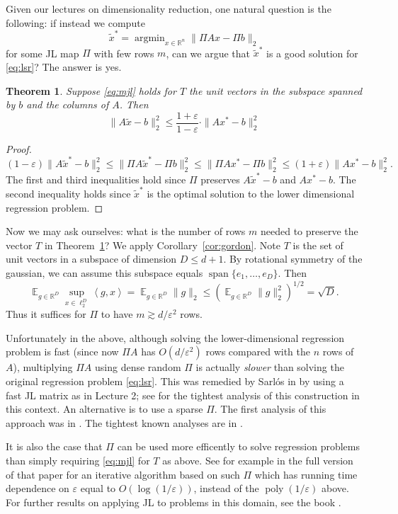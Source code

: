 \documentclass[12pt]{article}
\DeclareMathOperator*{\E}{\mathbb{E}}
\newcommand{\eps}{\varepsilon}
\newcommand{\inprod}[1]{\left\langle #1 \right\rangle}
\newcommand{\R}{\mathbb{R}}
\newtheorem{theorem}{Theorem}
\newcommand{\TheoremName}[1]{\label{thm:#1}}
\newcommand{\Corollary}[1]{Corollary~\ref{cor:#1}}
\newcommand{\Theorem}[1]{Theorem~\ref{thm:#1}}
\newcommand{\Eqsub}[1]{\eqref{eq:#1}}
\begin{document}
Given our lectures on dimensionality reduction, one natural question is the following: if instead we compute
$$
\tilde{x}^* = \mathop{argmin}_{x\in\R^n} \|\Pi Ax - \Pi b\|_2
$$
for some JL map $\Pi$ with few rows $m$, can we argue that $\tilde{x}^*$ is a good solution for \Eqsub{lsr}? The answer is yes.

\begin{theorem}\TheoremName{sarlos}
Suppose \Eqsub{mjl} holds for $T$ the unit vectors in the subspace spanned by $b$ and the columns of $A$. Then
$$
\|A\tilde{x} - b\|_2^2 \le \frac{1+\eps}{1-\eps}\cdot \|Ax^* - b\|_2^2
$$
\end{theorem}
\begin{proof}
$$
(1-\eps)\|A\tilde{x}^* - b\|_2^2 \le \|\Pi A\tilde{x}^* - \Pi b\|_2^2 \le \|\Pi Ax^* - \Pi b\|_2^2 \le (1+\eps)\|Ax^* - b\|_2^2 .
$$
The first and third inequalities hold since $\Pi$ preserves $A\tilde{x}^*-b$ and $Ax^*-b$. The second inequality holds since $\tilde{x}^*$ is the optimal solution to the lower dimensional regression problem.
\end{proof}

Now we may ask ourselves: what is the number of rows $m$ needed to preserve the vector $T$ in \Theorem{sarlos}? We apply \Corollary{gordon}. Note $T$ is the set of unit vectors in a subspace of dimension $D\le d+1$. By rotational symmetry of the gaussian, we can assume this subspace equals $\mathop{span}\{e_1,\ldots,e_D\}$. Then
$$
\E_{g\in\R^D} \sup_{x\in\ell_2^D}\inprod{g,x} = \E_{g\in\R^D} \|g\|_2 \le (\E_{g\in\R^D} \|g\|_2^2)^{1/2} = \sqrt{D} . 
$$
Thus it suffices for $\Pi$ to have $m\gtrsim d/\eps^2$ rows.

Unfortunately in the above, although solving the lower-dimensional regression problem is fast (since now $\Pi A$ has $O(d/\eps^2)$ rows compared with the $n$ rows of $A$), multiplying $\Pi A$ using dense random $\Pi$ is actually {\em slower} than solving the original regression problem \Eqsub{lsr}. This was remedied by Sarl\'{o}s in \cite{Sarlos06} by using a fast JL matrix as in Lecture 2; see \cite[Theorem 9]{CohenNW15} for the tightest analysis of this construction in this context. An alternative is to use a sparse $\Pi$. The first analysis of this approach was in \cite{ClarksonW13}. The tightest known analyses are in \cite{MengM13,NelsonN13,BourgainDN15}.

It is also the case that $\Pi$ can be used more efficently to solve regression problems than simply requiring \Eqsub{mjl} for $T$ as above. See for example \cite[Theorem 7.7]{ClarksonW13} in the full version of that paper for an iterative algorithm based on such $\Pi$ which has running time dependence on $\eps$ equal to $O(\log(1/\eps))$, instead of the $\mathop{poly}(1/\eps)$ above. For further results on applying JL to problems in this domain, see the book \cite{Woodruff14}.
\end{document}
